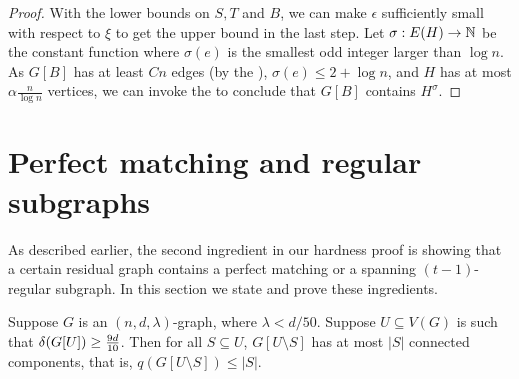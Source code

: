 \documentclass[11pt]{article}
\providecommand{\DIFadd}[1]{\textcolor{shin-ryoku}{#1}}%
\providecommand{\DIFaddbegin}{} %
\providecommand{\DIFaddend}{} %
\begin{document}
\begin{proof}
With the lower bounds on $S,T$ and $B$, we can make $\epsilon$ sufficiently small with respect to $\xi$ to get the upper bound in the last step.
    Let $\sigma: E(H) \to \mathbb{N}$ be the constant function where $\sigma(e)$ is the smallest odd integer larger than $\log n$. 
As $G[B]$ has at least $Cn$ edges (by \DIFaddbegin \DIFadd{the }\DIFaddend {}), $\sigma(e) \le 2 + \log n$, and $H$ has at most $\alpha \frac{n}{\log n}$ vertices, we can invoke \DIFaddbegin \DIFadd{the }\DIFaddend {} to conclude that $G[B]$ contains $H^\sigma$.
\end{proof}

\section{Perfect matching and regular subgraphs}
\label{sec:matching-machinery}
As described earlier, the second ingredient in our hardness proof is showing that a certain residual graph contains a perfect matching or a spanning $(t-1)$-regular subgraph. In this section we state and prove these ingredients.

\begin{lemma}\label{thm:perfect-matching}
Suppose $G$ is an $(n, d, \lambda)$-graph, where $\lambda < d/50$. 
Suppose $U \subseteq V(G)$ is such that $\delta(G[U]) \ge \frac{9d}{10}$. Then for all $S \subseteq U$, $G[U \setminus S]$ has at most $|S|$ connected components, that is, $q(G[U \setminus S]) \le |S|$.
\end{lemma}
\end{document}

